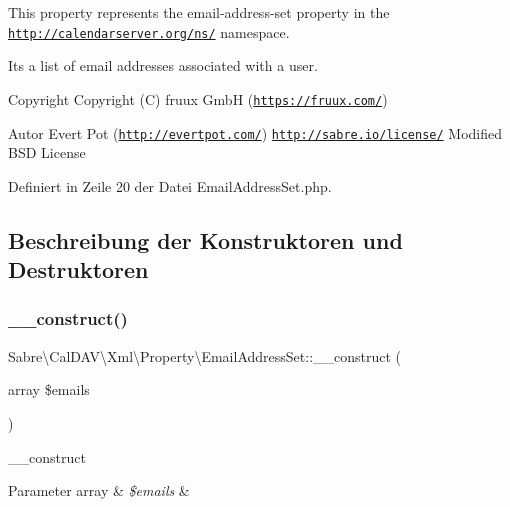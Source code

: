 This property represents the email-\/address-\/set property in the \href{http://calendarserver.org/ns/}{\tt http\+://calendarserver.\+org/ns/} namespace.

It\textquotesingle{}s a list of email addresses associated with a user.

\begin{DoxyCopyright}{Copyright}
Copyright (C) fruux GmbH (\href{https://fruux.com/}{\tt https\+://fruux.\+com/}) 
\end{DoxyCopyright}
\begin{DoxyAuthor}{Autor}
Evert Pot (\href{http://evertpot.com/}{\tt http\+://evertpot.\+com/})  \href{http://sabre.io/license/}{\tt http\+://sabre.\+io/license/} Modified B\+SD License 
\end{DoxyAuthor}


Definiert in Zeile 20 der Datei Email\+Address\+Set.\+php.



\subsection{Beschreibung der Konstruktoren und Destruktoren}
\mbox{\label{class_sabre_1_1_cal_d_a_v_1_1_xml_1_1_property_1_1_email_address_set_abad418f916f99fd4f6915b7b8cd2daaa}} 
\subsubsection{\texorpdfstring{\+\_\+\+\_\+construct()}{\_\_construct()}}
{\footnotesize\ttfamily Sabre\textbackslash{}\+Cal\+D\+A\+V\textbackslash{}\+Xml\textbackslash{}\+Property\textbackslash{}\+Email\+Address\+Set\+::\+\_\+\+\_\+construct (\begin{DoxyParamCaption}\item[{array}]{\$emails }\end{DoxyParamCaption})}

\+\_\+\+\_\+construct


\begin{DoxyParams}[1]{Parameter}
array & {\em \$emails} & \\
\hline
\end{DoxyParams}


